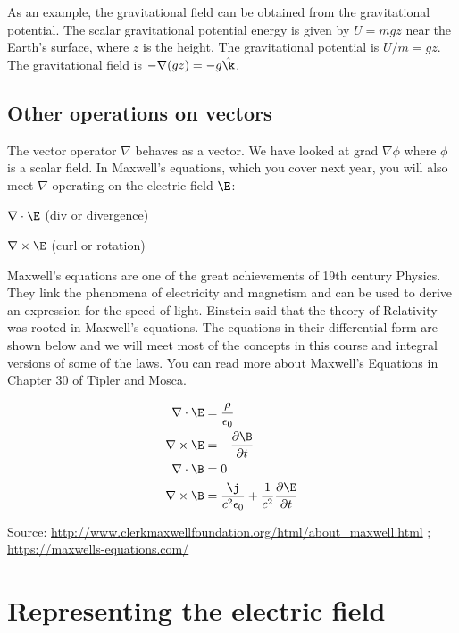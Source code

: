 \documentclass[
]{book}
\theoremstyle{definition}
\theoremstyle{definition}
\theoremstyle{definition}
\theoremstyle{definition}
\theoremstyle{remark}
\begin{document}
As an example, the gravitational field can be obtained from the
gravitational potential. The scalar gravitational potential energy is
given by \(U = mgz\) near the Earth's surface, where \(z\) is the height.
The gravitational potential is \(U/m = gz\). The gravitational field is
\(-\nabla(gz)=-g \hat{\k}\).

\hypertarget{other-operations-on-vectors}{%
\subsection{Other operations on vectors}\label{other-operations-on-vectors}}

The vector operator \(\nabla\) behaves as a vector. We have looked at grad
\(\nabla\phi\) where \(\phi\) is a scalar field. In Maxwell's equations,
which you cover next year, you will also meet \(\nabla\) operating on the
electric field \(\E\):

\(\nabla \cdot \E\) (div or divergence)

\(\nabla \times \E\) (curl or rotation)

Maxwell's equations are one of the great achievements of 19th century
Physics. They link the phenomena of electricity and magnetism and can be
used to derive an expression for the speed of light. Einstein said that
the theory of Relativity was rooted in Maxwell's equations. The
equations in their differential form are shown below and we will meet
most of the concepts in this course and integral versions of some of the
laws. You can read more about Maxwell's Equations in Chapter 30 of
Tipler and Mosca.

\[\begin{aligned}
\nabla \cdot \E &= \frac{\rho}{\epsilon_0} \\ 
\nabla \times \E &= - \frac{\partial \B}{\partial t} \\
\nabla \cdot \B &= 0 \\
\nabla \times \B &= \frac{\j}{c^2 \epsilon_0} + \frac{1}{c^2} \frac{\partial \E}{\partial t}
\end{aligned}\]

Source: \url{http://www.clerkmaxwellfoundation.org/html/about_maxwell.html}
; \url{https://maxwells-equations.com/}

\hypertarget{representing-the-electric-field}{%
\section{Representing the electric field}\label{representing-the-electric-field}}
\end{document}

